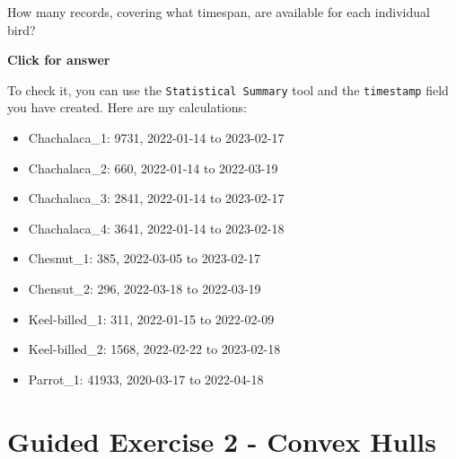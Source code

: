 \documentclass[
  letterpaper,
  DIV=11,
  numbers=noendperiod]{scrreprt}
\providecommand{\tightlist}{%
  \setlength{\itemsep}{0pt}\setlength{\parskip}{0pt}}\usepackage{longtable,booktabs,array}
\begin{document}
\begin{tcolorbox}[enhanced jigsaw, coltitle=black, toprule=.15mm, breakable, opacitybacktitle=0.6, left=2mm, colback=white, leftrule=.75mm, rightrule=.15mm, colbacktitle=quarto-callout-important-color!10!white, toptitle=1mm, titlerule=0mm, colframe=quarto-callout-important-color-frame, arc=.35mm, bottomtitle=1mm, opacityback=0, bottomrule=.15mm, title=\textcolor{quarto-callout-important-color}{\faExclamation}\hspace{0.5em}{Stop and Think}]

How many records, covering what timespan, are available for each
individual bird?

\end{tcolorbox}

\begin{tcolorbox}[enhanced jigsaw, toprule=.15mm, breakable, left=2mm, colframe=quarto-callout-important-color-frame, colback=white, arc=.35mm, leftrule=.75mm, opacityback=0, rightrule=.15mm, bottomrule=.15mm]

\vspace{-3mm}\textbf{Click for answer}\vspace{3mm}

To check it, you can use the \texttt{Statistical\ Summary} tool and the
\texttt{timestamp} field you have created. Here are my calculations:

\begin{itemize}
\tightlist
\item
  Chachalaca\_1: 9731, 2022-01-14 to 2023-02-17
\item
  Chachalaca\_2: 660, 2022-01-14 to 2022-03-19
\item
  Chachalaca\_3: 2841, 2022-01-14 to 2023-02-17
\item
  Chachalaca\_4: 3641, 2022-01-14 to 2023-02-18
\item
  Chesnut\_1: 385, 2022-03-05 to 2023-02-17
\item
  Chensut\_2: 296, 2022-03-18 to 2022-03-19
\item
  Keel-billed\_1: 311, 2022-01-15 to 2022-02-09
\item
  Keel-billed\_2: 1568, 2022-02-22 to 2023-02-18
\item
  Parrot\_1: 41933, 2020-03-17 to 2022-04-18
\end{itemize}

\end{tcolorbox}

\section{Guided Exercise 2 - Convex
Hulls}\label{guided-exercise-2---convex-hulls}
\end{document}
